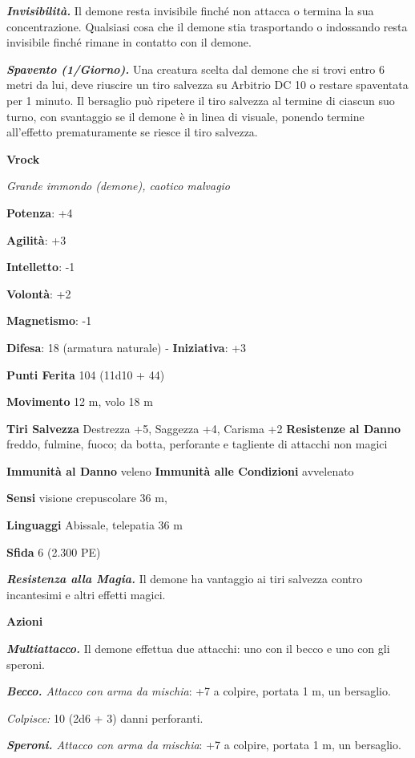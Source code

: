 \begin{multicols}{2}
\emph{\textbf{Invisibilità.}} Il demone resta invisibile finché non
attacca o termina la sua concentrazione. Qualsiasi cosa che il demone
stia trasportando o indossando resta invisibile finché rimane in
contatto con il demone.

\emph{\textbf{Spavento (1/Giorno).}} Una creatura scelta dal demone che
si trovi entro 6 metri da lui, deve riuscire un tiro salvezza su Arbitrio DC 10 o restare spaventata per 1 minuto. Il bersaglio può
ripetere il tiro salvezza al termine di ciascun suo turno, con
svantaggio se il demone è in linea di visuale, ponendo termine
all'effetto prematuramente se riesce il tiro salvezza.


\textbf{Vrock}

\emph{Grande immondo (demone), caotico malvagio}

\textbf{Potenza}: +4

\textbf{Agilità}: +3

\textbf{Intelletto}: -1

\textbf{Volontà}: +2

\textbf{Magnetismo}: -1

\textbf{Difesa}: 18 (armatura naturale) - \textbf{Iniziativa}: +3

\textbf{Punti Ferita} 104 (11d10 + 44)

\textbf{Movimento} 12 m, volo 18 m

\textbf{Tiri Salvezza} Destrezza +5, Saggezza +4, Carisma +2
\textbf{Resistenze al Danno} freddo, fulmine, fuoco; da botta,
perforante e tagliente di attacchi non magici

\textbf{Immunità al Danno} veleno \textbf{Immunità alle Condizioni}
avvelenato

\textbf{Sensi} visione crepuscolare 36 m, 

\textbf{Linguaggi} Abissale, telepatia 36 m 

\textbf{Sfida} 6 (2.300 PE)\smallskip

\emph{\textbf{Resistenza alla Magia.}} Il demone ha vantaggio ai tiri
salvezza contro incantesimi e altri effetti magici.

\smallskip\textbf{Azioni}

\emph{\textbf{Multiattacco.}} Il demone effettua due attacchi: uno con
il becco e uno con gli speroni.

\emph{\textbf{Becco.} Attacco con arma da mischia}: +7 a colpire,
portata 1 m, un bersaglio.

\emph{Colpisce:} 10 (2d6 + 3) danni perforanti.

\emph{\textbf{Speroni.} Attacco con arma da mischia}: +7 a colpire,
portata 1 m, un bersaglio.


\end{multicols}
